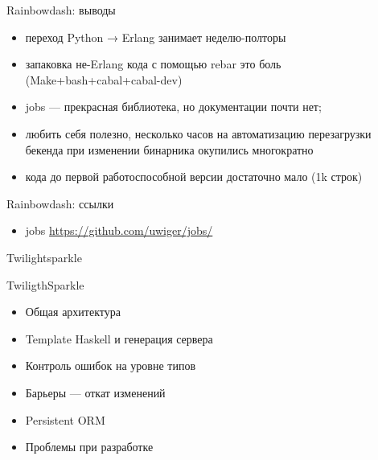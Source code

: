 \documentclass[10pt]{beamer}
\begin{document}
\begin{frame}{Rainbowdash: выводы}
  \begin{itemize}
  \item переход Python → Erlang занимает неделю-полторы
  \item запаковка не-Erlang кода с помощью rebar это боль (Make+bash+cabal+cabal-dev)
  \item jobs — прекрасная библиотека, но документации почти нет;
  \item любить себя полезно, несколько часов на автоматизацию перезагрузки бекенда при изменении бинарника окупились многократно
  \item кода до первой работоспособной версии достаточно мало (1k строк)
  \end{itemize}
\end{frame}

\begin{frame}{Rainbowdash: ссылки}
  \begin{itemize}
  \item jobs \url{https://github.com/uwiger/jobs/}
  \end{itemize}
\end{frame}

\begin{frame}
  \begin{center}
    \Large
    Twilightsparkle
  \end{center}
\end{frame}

\begin{frame}{TwiligthSparkle}
\begin{itemize}
  \item Общая архитектура
  \item Template Haskell и генерация сервера
  \item Контроль ошибок на уровне типов
  \item Барьеры — откат изменений
  \item Persistent ORM
  \item Проблемы при разработке
\end{itemize}
\end{frame}
\end{document}
